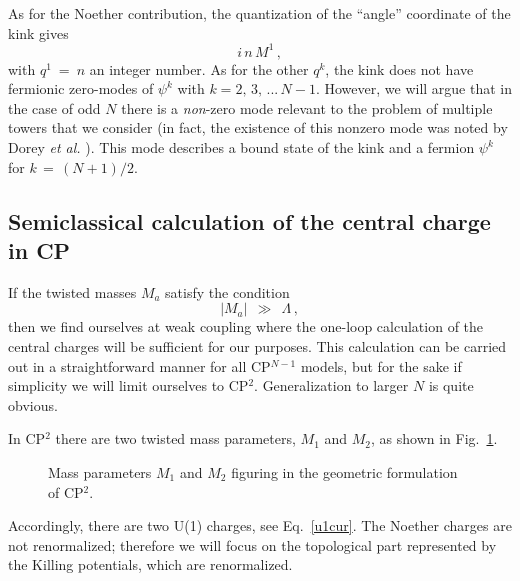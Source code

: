 \documentclass[epsfig,12pt]{article}
\def\beq{\begin{equation}}
\def\eeq{\end{equation}}
\def\beq{\begin{equation}}
\def\eeq{\end{equation}}
\begin{document}
	As for the Noether contribution, the quantization of the ``angle'' coordinate of the kink gives 
\beq
	i\, n\, M^1\,,
\eeq
	with $ q^1 ~=~ n $ an integer number.
	As for the other $ q^k $, the kink does not have fermionic zero-modes of $ \psi^k $ with $ k = 2,\, 3,\, ...\, N-1 $.
	However, we will argue that in the case of odd $ N $ there is a
	{\it non}-zero mode relevant to the problem of multiple towers that we consider (in fact, 
	the existence of this nonzero mode was noted by Dorey {\it et al.} \cite{Dorey:1999zk}).
	This mode describes a bound state of the kink and a fermion $ \psi^k $ for $ k \,=\, (N+1)/2 $.
     
\subsection[Semiclassical calculation of the central charge in CP$^2$]
	{Semiclassical calculation of the central charge in CP}
\label{semclas}
     
	If the twisted masses $M_a$ satisfy the condition
\beq
	| M_a | ~~\gg~~ \Lambda\,,
\eeq
	then we find ourselves at weak coupling where the one-loop calculation of the
	central charges will be sufficient for our purposes. 
	This calculation can be carried out in a straightforward manner for all CP$^{N-1}$ models, 
	but for the sake if simplicity we will limit ourselves to CP$^2$. 
	Generalization to larger $N$ is quite obvious. 
	
	In CP$^2$ there are two twisted mass parameters, $M_1$ and $M_2$, as shown in Fig.~\ref{fM}.
\begin{figure}
\begin{center}
\epsfxsize=5.0cm
\caption{Mass parameters $ M_1 $ and $ M_2 $ figuring in the geometric formulation of CP$^2$.}
\label{fM}
\end{center}
\end{figure}
	Accordingly, there are two U(1) charges, see Eq.~\eqref{u1cur}. 
	The Noether charges are not renormalized; 
	therefore we will focus on the topological part represented by the Killing potentials, 
	which are renormalized. 
\end{document}
